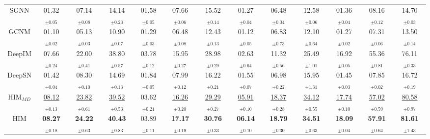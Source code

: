 \begin{table*}[!ht]
\begin{center}
{\begin{tabular}{c ccc ccc ccc ccc }
SGNN
    & 01.32$_{\pm0.05}$ & 07.14$_{\pm0.08}$ & 14.14$_{\pm0.23}$
    & 01.58$_{\pm0.05}$ & 07.66$_{\pm0.06}$ & 15.52$_{\pm0.14}$ 
    & 01.27$_{\pm0.04}$ & 06.48$_{\pm0.04}$ & 12.58$_{\pm0.06}$ 
    & 01.36$_{\pm0.04}$ & 08.16$_{\pm0.12}$ & 14.70$_{\pm0.03}$\\

GCNM
    & 01.10$_{\pm0.02}$ & 05.13$_{\pm0.03}$ & 10.90$_{\pm0.07}$
    & 01.29$_{\pm0.03}$ & 06.48$_{\pm0.08}$ & 12.43$_{\pm0.13}$ 
    & 01.12$_{\pm0.05}$ & 06.83$_{\pm0.73}$ & 12.10$_{\pm0.64}$ 
    & 01.27$_{\pm0.02}$ & 07.31$_{\pm0.06}$ & 13.50$_{\pm0.14}$\\
    
DeepIM
    & 07.66$_{\pm0.24}$ & 22.00$_{\pm0.41}$ & 38.80$_{\pm0.57}$
    & 03.78$_{\pm0.12}$ & 15.95$_{\pm0.27}$ & 28.98$_{\pm0.29}$ 
    & 02.63$_{\pm0.64}$ & 11.32$_{\pm0.56}$ & 25.49$_{\pm1.01}$ 
    & 16.92$_{\pm0.05}$ & 55.36$_{\pm0.81}$ & 76.11$_{\pm0.33}$\\

DeepSN
    & 01.42$_{\pm0.04}$ & 08.30$_{\pm0.10}$ & 14.69$_{\pm0.13}$
    & 01.84$_{\pm0.05}$ & 07.99$_{\pm0.12}$ & 16.22$_{\pm0.21}$ 
    & 01.55$_{\pm0.07}$ & 06.98$_{\pm0.22}$ & 15.95$_{\pm1.31}$ 
    & 01.45$_{\pm0.03}$ & 07.85$_{\pm0.02}$ & 16.72$_{\pm0.19}$\\
    
\midrule
HIM$_{MD}$
    & \underline{08.12}$_{\pm0.13}$ & \underline{23.82}$_{\pm0.61}$ & \underline{39.52}$_{\pm0.53}$ 
    & 03.62$_{\pm0.21}$ & \underline{16.26}$_{\pm0.20}$ & \underline{29.29}$_{\pm0.27}$ 
    & \underline{05.91}$_{\pm0.10}$ & \underline{18.37}$_{\pm0.28}$ & \underline{34.12}$_{\pm0.55}$ 
    & \underline{17.74}$_{\pm0.10}$ & \underline{57.02}$_{\pm0.59}$ & \underline{80.58}$_{\pm0.97}$\\  

HIM
    & \textbf{08.27}$_{\pm0.18}$ & \textbf{24.22}$_{\pm0.63}$ & \textbf{40.43}$_{\pm0.83}$
    & 03.89$_{\pm0.11}$ & \textbf{17.17}$_{\pm0.19}$ & \textbf{30.76}$_{\pm0.33}$ 
    & \textbf{06.14}$_{\pm0.10}$ & \textbf{18.79}$_{\pm0.30}$ & \textbf{34.51}$_{\pm0.63}$ 
    & \textbf{18.09}$_{\pm0.04}$ & \textbf{57.91}$_{\pm0.64}$ & \textbf{81.61}$_{\pm1.43}$\\ 

\bottomrule
\end{tabular}}
\label{table:result-lt}
\end{center}
\end{table*}